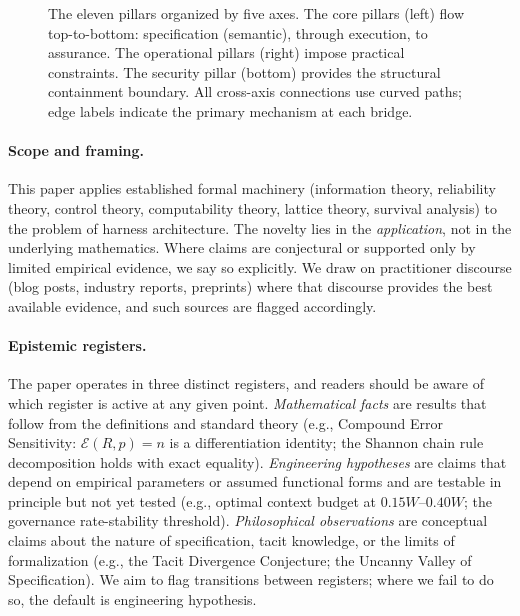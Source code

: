 \documentclass[11pt, a4paper]{googledeepmind}
\begin{document}
\begin{figure}[t]
\begin{tikzpicture}
\end{tikzpicture}
\caption{The eleven pillars organized by five axes. The core pillars (left) flow top-to-bottom: specification (semantic), through execution, to assurance. The operational pillars (right) impose practical constraints. The security pillar (bottom) provides the structural containment boundary. All cross-axis connections use curved paths; edge labels indicate the primary mechanism at each bridge.}
\label{fig:pillar-architecture}
\end{figure}

\paragraph{Scope and framing.} This paper applies established formal machinery (information theory, reliability theory, control theory, computability theory, lattice theory, survival analysis) to the problem of harness architecture. The novelty lies in the \emph{application}, not in the underlying mathematics. Where claims are conjectural or supported only by limited empirical evidence, we say so explicitly. We draw on practitioner discourse (blog posts, industry reports, preprints) where that discourse provides the best available evidence, and such sources are flagged accordingly.

\paragraph{Epistemic registers.} The paper operates in three distinct registers, and readers should be aware of which register is active at any given point. \emph{Mathematical facts} are results that follow from the definitions and standard theory (e.g., Compound Error Sensitivity: $\mathcal{E}(R,p) = n$ is a differentiation identity; the Shannon chain rule decomposition holds with exact equality). \emph{Engineering hypotheses} are claims that depend on empirical parameters or assumed functional forms and are testable in principle but not yet tested (e.g., optimal context budget at $0.15W$--$0.40W$; the governance rate-stability threshold). \emph{Philosophical observations} are conceptual claims about the nature of specification, tacit knowledge, or the limits of formalization (e.g., the Tacit Divergence Conjecture; the Uncanny Valley of Specification). We aim to flag transitions between registers; where we fail to do so, the default is engineering hypothesis.
\end{document}
